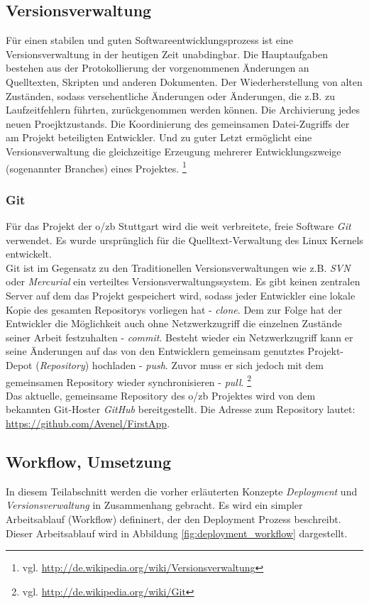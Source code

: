 \documentclass[12pt,             %
               a4paper,          %
               listof=totoc,     %
               index=totoc,      %
               bibliography=totoc,%
               oneside,         %
               BCOR1cm,          %
               english   %
               ]{scrbook}
\begin{document}
\subsection{Versionsverwaltung}
Für einen stabilen und guten Softwareentwicklungsprozess ist eine Versionsverwaltung in der heutigen Zeit unabdingbar. Die Hauptaufgaben bestehen aus der Protokollierung der vorgenommenen Änderungen an Quelltexten, Skripten und anderen Dokumenten. Der Wiederherstellung von alten Zuständen, sodass versehentliche Änderungen oder Änderungen, die z.B. zu Laufzeitfehlern führten, zurückgenommen werden können. Die Archivierung jedes neuen Proejktzustands. Die Koordinierung des gemeinsamen Datei-Zugriffs der am Projekt beteiligten Entwickler. Und zu guter Letzt ermöglicht eine Versionsverwaltung die gleichzeitige Erzeugung mehrerer Entwicklungszweige (sogenannter \glqq Branches\grqq) eines Projektes. \footnote{vgl. \url{http://de.wikipedia.org/wiki/Versionsverwaltung}}

\subsubsection{Git}
Für das Projekt der o/zb Stuttgart wird die weit verbreitete, freie Software \textit{Git} verwendet. Es wurde ursprünglich für die Quelltext-Verwaltung des Linux Kernels entwickelt.\\
Git ist im Gegensatz zu den Traditionellen Versionsverwaltungen wie z.B. \textit{SVN} oder \textit{Mercurial} ein verteiltes Versionsverwaltungssystem. Es gibt keinen zentralen Server auf dem das Projekt gespeichert wird, sodass jeder Entwickler eine lokale Kopie des gesamten Repositorys vorliegen hat - \textit{clone}. Dem zur Folge hat der Entwickler die Möglichkeit auch ohne Netzwerkzugriff die einzelnen Zustände seiner Arbeit festzuhalten - \textit{commit}. Besteht wieder ein Netzwerkzugriff kann er seine Änderungen auf das von den Entwicklern gemeinsam genutztes Projekt-Depot (\textit{Repository}) hochladen - \textit{push}. Zuvor muss er sich jedoch mit dem gemeinsamen Repository wieder synchronisieren - \textit{pull}. \footnote{vgl. \url{http://de.wikipedia.org/wiki/Git}}\\

Das aktuelle, gemeinsame Repository des o/zb Projektes wird von dem bekannten Git-Hoster \textit{GitHub} bereitgestellt. Die Adresse zum Repository lautet: \url{https://github.com/Avenel/FirstApp}.

\subsection{Workflow, Umsetzung}
In diesem Teilabschnitt werden die vorher erläuterten Konzepte \textit{Deployment} und \textit{Versionsverwaltung} in Zusammenhang gebracht. Es wird ein simpler Arbeitsablauf (\glqq Workflow\grqq) defininert, der den Deployment Prozess beschreibt. Dieser Arbeitsablauf wird in Abbildung \vref{fig:deployment_workflow} dargestellt.
\end{document}
